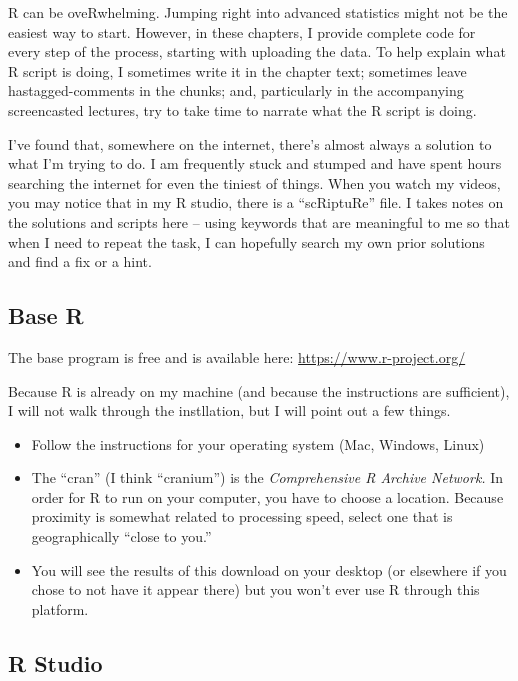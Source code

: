 \documentclass[
]{book}
\providecommand{\tightlist}{%
  \setlength{\itemsep}{0pt}\setlength{\parskip}{0pt}}
\begin{document}
R can be oveRwhelming. Jumping right into advanced statistics might not be the easiest way to start. However, in these chapters, I provide complete code for every step of the process, starting with uploading the data. To help explain what R script is doing, I sometimes write it in the chapter text; sometimes leave hastagged-comments in the chunks; and, particularly in the accompanying screencasted lectures, try to take time to narrate what the R script is doing.

I've found that, somewhere on the internet, there's almost always a solution to what I'm trying to do. I am frequently stuck and stumped and have spent hours searching the internet for even the tiniest of things. When you watch my videos, you may notice that in my R studio, there is a ``scRiptuRe'' file. I takes notes on the solutions and scripts here -- using keywords that are meaningful to me so that when I need to repeat the task, I can hopefully search my own prior solutions and find a fix or a hint.

\hypertarget{base-r}{%
\subsection{Base R}\label{base-r}}

The base program is free and is available here: \url{https://www.r-project.org/}

Because R is already on my machine (and because the instructions are sufficient), I will not walk through the instllation, but I will point out a few things.

\begin{itemize}
\tightlist
\item
  Follow the instructions for your operating system (Mac, Windows, Linux)
\item
  The ``cran'' (I think ``cranium'') is the \emph{Comprehensive R Archive Network.} In order for R to run on your computer, you have to choose a location. Because proximity is somewhat related to processing speed, select one that is geographically ``close to you.''
\item
  You will see the results of this download on your desktop (or elsewhere if you chose to not have it appear there) but you won't ever use R through this platform.
\end{itemize}

\hypertarget{r-studio}{%
\subsection{R Studio}\label{r-studio}}
\end{document}

